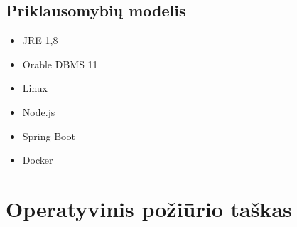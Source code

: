 \documentclass{VUMIFPSmagistrinis}
\begin{document}
			\subsection{Priklausomybių modelis}
				\begin{itemize}
					\item{JRE 1,8}
					\item{Orable DBMS 11}
					\item{Linux}
					\item{Node.js}
					\item{Spring Boot}
					\item{Docker}
				\end{itemize}
			
		\section{Operatyvinis požiūrio taškas}
		
\end{document}
